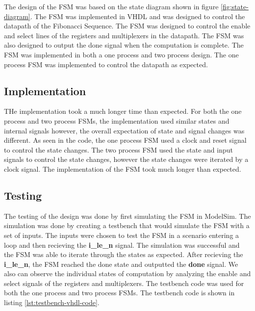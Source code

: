 \documentclass{article}
\begin{document}
The design of the FSM was based on the state diagram shown in figure \ref{fig:state-diagram}. The FSM was implemented in VHDL and was designed to control the datapath of the Fibonacci Sequence. The FSM was designed to control the enable and select lines of the registers and multiplexers in the datapath. The FSM was also designed to output the done signal when the computation is complete. The FSM was implemented in both a one process and two process design. The one process FSM was implemented to control the datapath as expected. 

\subsection*{Implementation}

THe implementation took a much longer time than expected. For both the one process and two process FSMs, the implementation used similar states and internal signals however, the overall expectation of state and signal changes was different. As seen in the code, the one process FSM used a clock and reset signal to control the state changes. The two process FSM used the state and input signals to control the state changes, however the state changes were iterated by a clock signal. The implementation of the FSM took much longer than expected. 

\subsection*{Testing}
The testing of the design was done by first simulating the FSM in ModelSim. The simulation was done by creating a testbench that would simulate the FSM with a set of inputs. The inputs were chosen to test the FSM in a scenario entering a loop and then recieving the \textbf{i\_le\_n} signal. The simulation was successful and the FSM was able to iterate through the states as expected. After recieving the \textbf{i\_le\_n}, the FSM reached the done state and outputted the \textbf{done} signal. We also can observe the individual states of computation by analyzing the enable and select signals of the registers and multiplexers. The testbench code was used for both the one process and two process FSMs. The testbench code is shown in listing \ref{lst:testbench-vhdl-code}. 
\end{document}
